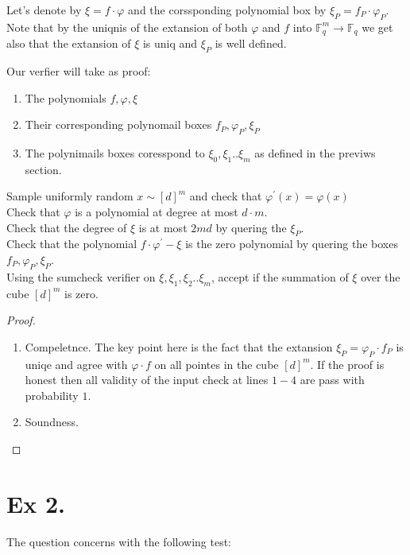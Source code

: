 \documentclass{article}
\newcommand{\FF}{\mathbb{F}_{q}}
\begin{document}
Let's denote by $\xi = f\cdot\varphi$ and the corssponding polynomial box by $\xi_{P} = f_{P} \cdot \varphi_{P}$. Note that by the uniqnis of the extansion of both $\varphi$ and $f$ into $\FF^{m}\rightarrow \FF$ we get also that the extansion of $\xi$ is uniq and $\xi_{P}$ is well defined.  

Our verfier will take as proof: 

\begin{enumerate}
  \item The polynomials $f,\varphi, \xi$ 
  \item Their corresponding polynomail boxes $f_{P},\varphi_{P}, \xi_{P}$ 
  \item The polynimails boxes coresspond to $\xi_{0}, \xi_{1} .. \xi_{m}$ as defined in the previws section.  
\end{enumerate}

\begin{algorithm}[H]
  Sample uniformly random $x \sim  [d]^{m}$ and check that $\varphi^{\prime}\left( x \right) = \varphi\left( x \right)$   \\
  Check that $\varphi$ is a polynomial at degree at most $d\cdot m$. \\
  Check that the degree of $\xi$ is at most $2md$ by quering the $\xi_{P}$.\\ 
  Check that the polynomial $f\cdot \varphi^{\prime} - \xi$ is the zero polynomial by quering the boxes $f_{P},\varphi_{P},\xi_{P}$. \\
  Using the sumcheck verifier on $\xi, \xi_{1},\xi_{2} .. \xi_{m}$, accept if the summation of $\xi$ over the cube $[d]^{m}$ is zero.  
\end{algorithm}

\begin{proof} 
  \begin{enumerate}
    \item Compeletnce. The key point here is the fact that the extansion $\xi_{P} = \varphi_{P} \cdot f_{P}$ is uniqe and agree with $\varphi\cdot f$ on all pointes in the cube $[d]^{m}$. If the proof is honest then all validity of the input check at lines $1-4$ are pass with probability $1$.   
    \item Soundness.  
  \end{enumerate}
\end{proof}

\section{Ex 2.}
The question concerns with the following test: 
\end{document}
